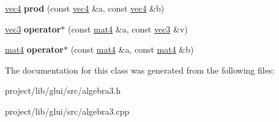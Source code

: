 \begin{DoxyCompactItemize}
\item 
\hypertarget{classvec4_a63ceed040a54841b149af112fe18d491}{\hyperlink{classvec4}{vec4} {\bfseries prod} (const \hyperlink{classvec4}{vec4} \&a, const \hyperlink{classvec4}{vec4} \&b)}\label{classvec4_a63ceed040a54841b149af112fe18d491}

\item 
\hypertarget{classvec4_a3a7a7dfc514a58f3c889b48fa4745815}{\hyperlink{classvec3}{vec3} {\bfseries operator$\ast$} (const \hyperlink{classmat4}{mat4} \&a, const \hyperlink{classvec3}{vec3} \&v)}\label{classvec4_a3a7a7dfc514a58f3c889b48fa4745815}

\item 
\hypertarget{classvec4_a15e77864e523807c2e4d9172f58cc96b}{\hyperlink{classmat4}{mat4} {\bfseries operator$\ast$} (const \hyperlink{classmat4}{mat4} \&a, const \hyperlink{classmat4}{mat4} \&b)}\label{classvec4_a15e77864e523807c2e4d9172f58cc96b}

\end{DoxyCompactItemize}


The documentation for this class was generated from the following files\-:\begin{DoxyCompactItemize}
\item 
project/lib/glui/src/algebra3.\-h\item 
project/lib/glui/src/algebra3.\-cpp\end{DoxyCompactItemize}
